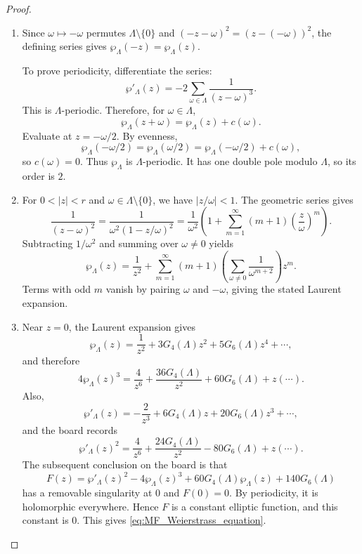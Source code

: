 \begin{proof}
\begin{enumerate}[label=(\arabic*)]
        \item Since $\omega \mapsto -\omega$ permutes $\Lambda \setminus \{0\}$ and $(-z - \omega)^2 = (z - (-\omega))^2$, the defining series gives $\wp_\Lambda(-z) = \wp_\Lambda(z)$.

        To prove periodicity, differentiate the series:
        \[
            \wp'_\Lambda(z) = -2\sum_{\omega \in \Lambda}\frac{1}{(z - \omega)^3}.
        \]
        This is $\Lambda$-periodic. Therefore, for $\omega \in \Lambda$,
        \begin{equation}\label{eq:MF_Weierstrass_period_constant}
            \wp_\Lambda(z + \omega) = \wp_\Lambda(z) + c(\omega).
        \end{equation}
        Evaluate at $z = -\omega/2$. By evenness,
        \[
            \wp_\Lambda(-\omega/2) = \wp_\Lambda(\omega/2) = \wp_\Lambda(-\omega/2) + c(\omega),
        \]
        so $c(\omega) = 0$. Thus $\wp_\Lambda$ is $\Lambda$-periodic. It has one double pole modulo $\Lambda$, so its order is $2$.

        \item For $0 < |z| < r$ and $\omega \in \Lambda \setminus \{0\}$, we have $|z/\omega| < 1$. The geometric series gives
        \[
            \frac{1}{(z - \omega)^2} = \frac{1}{\omega^2(1 - z/\omega)^2} = \frac{1}{\omega^2}\left(1 + \sum_{m = 1}^{\infty}(m + 1)\left(\frac{z}{\omega}\right)^m\right).
        \]
        Subtracting $1/\omega^2$ and summing over $\omega \neq 0$ yields
        \[
            \wp_\Lambda(z) = \frac{1}{z^2} + \sum_{m = 1}^{\infty}(m + 1)\left(\sum_{\omega \neq 0}\frac{1}{\omega^{m + 2}}\right)z^m.
        \]
        Terms with odd $m$ vanish by pairing $\omega$ and $-\omega$, giving the stated Laurent expansion.

        \item Near $z = 0$, the Laurent expansion gives
        \[
            \wp_\Lambda(z) = \frac{1}{z^2} + 3G_4(\Lambda)z^2 + 5G_6(\Lambda)z^4 + \cdots,
        \]
        and therefore
        \[
            4\wp_\Lambda(z)^3 = \frac{4}{z^6} + \frac{36G_4(\Lambda)}{z^2} + 60G_6(\Lambda) + z(\cdots).
        \]
        Also,
        \[
            \wp'_\Lambda(z) = -\frac{2}{z^3} + 6G_4(\Lambda)z + 20G_6(\Lambda)z^3 + \cdots,
        \]
        and the board records
        \[
            \wp'_\Lambda(z)^2 = \frac{4}{z^6} + \frac{24G_4(\Lambda)}{z^2} - 80G_6(\Lambda) + z(\cdots).
        \]
        The subsequent conclusion on the board is that
        \[
            F(z) = \wp'_\Lambda(z)^2 - 4\wp_\Lambda(z)^3 + 60G_4(\Lambda)\wp_\Lambda(z) + 140G_6(\Lambda)
        \]
        has a removable singularity at $0$ and $F(0) = 0$. By periodicity, it is holomorphic everywhere. Hence $F$ is a constant elliptic function, and this constant is $0$. This gives \eqref{eq:MF_Weierstrass_equation}.


\end{enumerate}
\end{proof}
